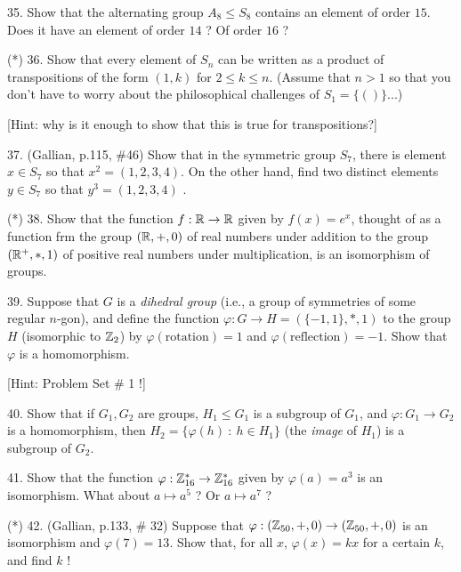 \documentclass[12pt]{article}
\begin{document}
\begin{description}

\item{35.} Show that the alternating group $A_8\leq S_8$ contains
an element of order $15$. Does it have an element of order $14$ ? Of order $16$ ?

\msk

\item{(*) 36.} Show that every element of $S_n$ can be written 
as a product of transpositions of the form $(1,k)$ for $2\leq k\leq n$. (Assume that
$n>1$ so that you don't have to worry about the philosophical challenges of $S_1=\{()\}$...)

\msk

\item{\spc} [Hint: why is it enough to show that this is true for transpositions?]

\msk

\item{37.} (Gallian, p.115, \#46) Show that in the symmetric group $S_7$,
there is  element $x\in S_7$ so that $x^2=(1,2,3,4)$. On
the other hand, find two distinct elements $y\in S_7$ so that 
$y^3=(1,2,3,4)$ .

\msk

\item{(*) 38.} Show that the function $f:{\mathbb R}\rightarrow{\mathbb R}$ given by $f(x)=e^x$, thought of as a function
frm the group $({\mathbb R},+,0)$ of real numbers under addition to the group $({\mathbb R}^+,*,1)$ of positive real 
numbers under multiplication, is an isomorphism of groups.  

\msk

\item{39.} Suppose that $G$ is a {\it dihedral group} (i.e., a group 
of symmetries of some regular $n$-gon), and define the function $\varphi:G\rightarrow H = (\{-1,1\},*,1)$
to the group $H$ (isomorphic to ${\mathbb Z}_2$) by $\varphi(\textrm{rotation})=1$ 
and $\varphi(\textrm{reflection})=-1$. Show that $\varphi$ is a homomorphism. 

\msk

\item{\spc} [Hint: Problem Set \# 1 !]

\msk

\item{40.} Show that if $G_1,G_2$ are groups, $H_1\leq G_1$ is a subgroup of $G_1$, and 
$\varphi:G_1\rightarrow G_2$ is a homomorphism, then $H_2=\{\varphi(h)\ :\ h\in H_1\}$
(the {\it image} of $H_1$) is a subgroup of $G_2$.

\msk

\item{41.} Show that the function $\varphi:{\mathbb Z}_{16}^*\rightarrow {\mathbb Z}_{16}^*$
given by $\varphi(a) = a^3$ is an isomorphism. What about $a\mapsto a^5$ ? Or $a\mapsto a^7$ ?

\msk

\item{(*) 42.} (Gallian, p.133, \# 32) Suppose that $\varphi:({\mathbb Z}_{50},+,0)\rightarrow({\mathbb Z}_{50},+,0)$
is an isomorphism and $\varphi(7) = 13$. Show that, for all $x$, $\varphi(x)=kx$ for a certain $k$, 
and find $k$ !


\end{description}
\vfill
\end{document}
